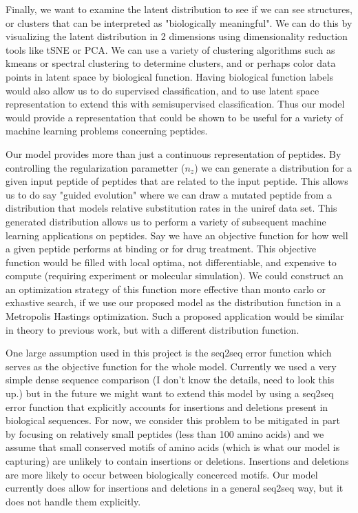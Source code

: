 \documentclass[preprint,12pt]{elsarticle}
\begin{document}
Finally, we want to examine the latent distribution to see if we can see structures, or clusters that can be interpreted as "biologically meaningful". We can do this by visualizing the latent distribution in 2 dimensions using dimensionality reduction tools like tSNE or PCA. We can use a variety of clustering algorithms such as kmeans or spectral clustering to determine clusters, and or perhaps color data points in latent space by biological function. Having biological function labels would also allow us to do supervised classification, and to use latent space representation to extend this with semisupervised classification. Thus our model would provide a representation that could be shown to be useful for a variety of machine learning problems concerning peptides.

Our model provides more than just a continuous representation of peptides. By controlling the regularization parametter ($n_z$) we can generate a distribution for a given input peptide of peptides that are related to the input peptide. This allows us to do say "guided evolution" where we can draw a mutated peptide from a distribution that models relative substitution rates in the uniref data set. This generated distribution allows us to perform a variety of subsequent machine learning applications on peptides. Say we have an objective function for how well a given peptide performs at binding or for drug treatment. This objective function would be filled with local optima, not differentiable, and expensive to compute (requiring experiment or molecular simulation). We could construct an an optimization strategy of this function more effective than monto carlo or exhastive search, if we use our proposed model as the distribution function in a Metropolis Hastings optimization. Such a proposed application would be similar in theory to previous work, but with a different distribution function\cite{giguere2013improved}.

One large assumption used in this project is the seq2seq error function which serves as the objective function for the whole model. Currently we used a very simple dense sequence comparison (I don't know the details, need to look this up.) but in the future we might want to extend this model by using a seq2seq error function that explicitly accounts for insertions and deletions present in biological sequences. For now, we consider this problem to be mitigated in part by focusing on relatively small peptides (less than 100 amino acids) and we assume that small conserved motifs of amino acids (which is what our model is capturing) are unlikely to contain insertions or deletions. Insertions and deletions are more likely to occur between biologically concerced motifs. Our model currently does allow for insertions and deletions in a general seq2seq way, but it does not handle them explicitly.
\end{document}
